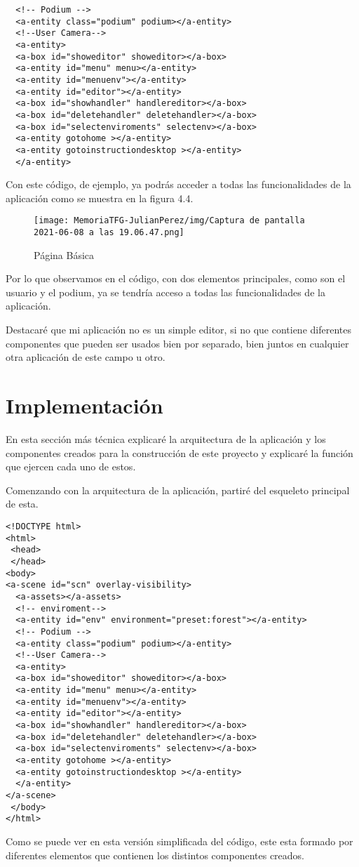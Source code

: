 \documentclass[a4paper, 12pt]{book}
\begin{document}
{\scriptsize
\begin{verbatim}
  <!-- Podium -->
  <a-entity class="podium" podium></a-entity> 
  <!--User Camera-->
  <a-entity>
  <a-box id="showeditor" showeditor></a-box>
  <a-entity id="menu" menu></a-entity>
  <a-entity id="menuenv"></a-entity>
  <a-entity id="editor"></a-entity>
  <a-box id="showhandler" handlereditor></a-box>
  <a-box id="deletehandler" deletehandler></a-box>
  <a-box id="selectenviroments" selectenv></a-box>
  <a-entity gotohome ></a-entity>
  <a-entity gotoinstructiondesktop ></a-entity>
  </a-entity>
\end{verbatim}
}
Con este código, de ejemplo, ya podrás acceder a todas las funcionalidades de la aplicación como se muestra en la figura 4.4.

\begin{figure}[H]
  \centering
  \texttt{[image: MemoriaTFG-JulianPerez/img/Captura de pantalla 2021-06-08 a las 19.06.47.png]}
  \caption{Página Básica }\label{home}
\end{figure}

Por lo que observamos en el código, con dos elementos principales, como son el usuario y el podium, ya se tendría acceso a todas las funcionalidades de la aplicación.

Destacaré que mi aplicación no es un simple editor, si no que contiene diferentes componentes que pueden ser usados bien por separado, bien juntos en cualquier otra aplicación de este campo u otro.

\section{Implementación} 
\label{sec:Arquitectura resultante}
En esta sección más técnica explicaré la arquitectura de la aplicación y los componentes creados para la construcción de este proyecto y explicaré la función que ejercen cada uno de estos.

Comenzando con la arquitectura de la aplicación, partiré del esqueleto principal de esta.
{\scriptsize
\begin{verbatim}
<!DOCTYPE html>
<html>
 <head>
 </head>
<body>
<a-scene id="scn" overlay-visibility>
  <a-assets></a-assets>
  <!-- enviroment-->
  <a-entity id="env" environment="preset:forest"></a-entity>
  <!-- Podium -->
  <a-entity class="podium" podium></a-entity> 
  <!--User Camera-->
  <a-entity>
  <a-box id="showeditor" showeditor></a-box>
  <a-entity id="menu" menu></a-entity>
  <a-entity id="menuenv"></a-entity>
  <a-entity id="editor"></a-entity>
  <a-box id="showhandler" handlereditor></a-box>
  <a-box id="deletehandler" deletehandler></a-box>
  <a-box id="selectenviroments" selectenv></a-box>
  <a-entity gotohome ></a-entity>
  <a-entity gotoinstructiondesktop ></a-entity>
  </a-entity>
</a-scene>
 </body>
</html> 
\end{verbatim}
}
Como se puede ver en esta versión simplificada del código, este esta formado por diferentes elementos que contienen los distintos componentes creados.
\end{document}
